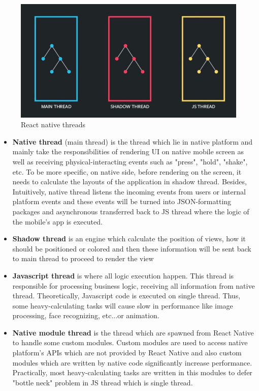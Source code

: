 \begin{figure}[!h]
   	\centering
    	\includegraphics[scale=0.4]{Picture/mobile/RN-thread.jpeg}
    	\caption{React native threads}
	\label{fig:RN-threads}
\end{figure}

\begin{itemize}
\item \textbf{Native thread} (main thread) is the thread which lie in native platform and mainly take the responsibilities of rendering UI on native mobile screen as well as receiving physical-interacting events such as "press", "hold", "shake", etc. To be more specific, on native side, before rendering on the screen, it needs to calculate the layouts of the application in shadow thread. Besides, Intuitively, native thread listens the incoming events from users or internal platform events and these events will be turned into JSON-formatting packages and asynchronous transferred back to JS thread where the logic of the mobile's app is executed.
\item \textbf{Shadow thread} is an engine which calculate the position of views, how it should be positioned or colored and then these information will be sent back to main thread to proceed to render the view
\item	\textbf{Javascript thread} is where all logic execution happen. This thread is responsible for processing business logic, receiving all information from native thread. Theoretically, Javascript code is executed on single thread. Thus, some heavy-calculating tasks will cause slow in performance like image processing, face recognizing, etc...or animation. 
\item \textbf{Native module thread} is the thread which are spawned from React Native to handle some custom modules. Custom modules are used to access native platform's APIs which are not provided by React Native and also custom modules which are written by native code significantly increase performance. Practically, most heavy-calculating tasks are written in this modules to defer "bottle neck" problem in JS thread which is single thread. 
\end{itemize}

